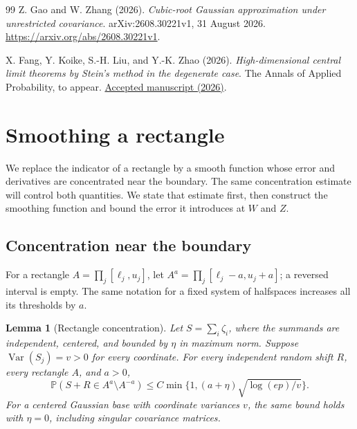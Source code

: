 \documentclass[11pt,letterpaper]{article}
\newtheorem{lemma}{Lemma}
\theoremstyle{remark}
\newcommand{\Pp}{\mathbb P}
\newcommand{\Var}{\operatorname{Var}}
\begin{document}
\begin{thebibliography}{99}
Z. Gao and W. Zhang (2026).
\emph{Cubic-root Gaussian approximation under unrestricted covariance}.
arXiv:2608.30221v1, 31 August 2026.
\url{https://arxiv.org/abs/2608.30221v1}.

X. Fang, Y. Koike, S.-H. Liu, and Y.-K. Zhao (2026).
\emph{High-dimensional central limit theorems by Stein's method in
the degenerate case}. The Annals of Applied Probability, to appear.
\href{https://research.cuhk.edu.hk/en/publications/high-dimensional-central-limit-theorems-by-steins-method-in-the-d/}{Accepted manuscript (2026)}.

\end{thebibliography}



\clearpage
\appendix
{}
\section{Smoothing a rectangle}\label{appx-sec:smoothing}

We replace the indicator of a rectangle by a smooth function whose error
and derivatives are concentrated near the boundary.  The same
concentration estimate will control both quantities.  We state that
estimate first, then construct the smoothing function and bound the
error it introduces at \(W\) and \(Z\).

\subsection{Concentration near the boundary}

For a rectangle \(A=\prod_j[\ell_j,u_j]\), let
\(A^a=\prod_j[\ell_j-a,u_j+a]\); a reversed interval is empty.
The same notation for a fixed system of halfspaces increases all its
thresholds by \(a\).

\begin{lemma}[Rectangle concentration]\label{appx-lem:concentration}
Let \(S=\sum_i\zeta_i\), where the summands are independent, centered,
and bounded by \(\eta\) in maximum norm. Suppose
\(\Var(S_j)=v>0\) for every coordinate. For every independent random
shift \(R\), every rectangle \(A\), and \(a>0\),
\begin{equation}
 \Pp(S+R\in A^a\setminus A^{-a})
 \le C\min\{1,(a+\eta)\sqrt{\log(ep)/v}\}.
 \label{appx-eq:concentration}
\end{equation}
For a centered Gaussian base with coordinate variances \(v\), the same
bound holds with \(\eta=0\), including singular covariance matrices.
\end{lemma}
\end{document}
